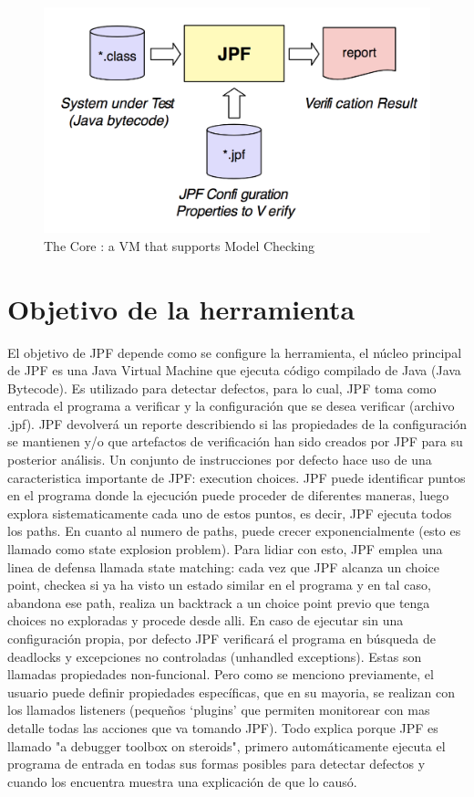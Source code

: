 \documentclass[runningheads]{llncs}
\begin{document}
\begin{figure}
\includegraphics[width=\textwidth]{fig1.png}
\caption{The Core : a VM that supports Model Checking} \label{fig1}
\end{figure}

\section{Objetivo de la herramienta}



El objetivo de JPF depende como se configure la herramienta, el núcleo principal de JPF es una Java Virtual Machine que ejecuta código compilado de Java (Java Bytecode). Es utilizado para detectar defectos, para lo cual, JPF toma como entrada el programa a verificar y la configuración que se desea verificar (archivo .jpf). JPF devolverá un reporte describiendo si las propiedades de la configuración se mantienen y/o que artefactos de verificación han sido creados por JPF para su posterior análisis. 
Un conjunto de instrucciones por defecto hace uso de una caracteristica importante de JPF: execution choices. JPF puede identificar puntos en el programa donde la ejecuci\'on puede proceder de diferentes maneras, luego explora sistematicamente cada uno de estos puntos, es decir, JPF ejecuta todos los paths. En cuanto al numero de paths, puede crecer exponencialmente (esto es llamado como state explosion problem). Para lidiar con esto, JPF emplea una linea de defensa llamada state matching: cada vez que JPF alcanza un choice point, checkea si ya ha visto un estado similar en el programa y en tal caso, abandona ese path, realiza un backtrack a un choice point previo que tenga choices no exploradas y procede desde alli. 
En caso de ejecutar sin una configuración propia, por defecto JPF verificará el programa en búsqueda de deadlocks y excepciones no controladas (unhandled exceptions). Estas son llamadas propiedades non-funcional. Pero como se menciono previamente, el usuario puede definir propiedades espec\'ificas, que en su mayoria, se realizan con los llamados listeners (pequeños ‘plugins’ que permiten monitorear con mas detalle todas las acciones que va tomando JPF). Todo explica porque JPF es llamado "a debugger toolbox on steroids", primero automáticamente ejecuta el programa de entrada en todas sus formas posibles para detectar defectos y cuando los encuentra muestra una explicación de que lo causó.
\end{document}
